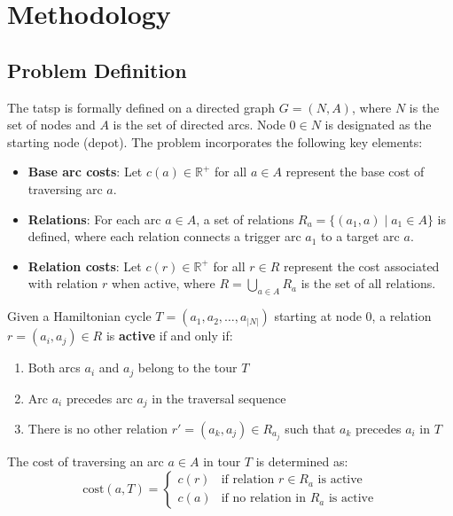\documentclass[twocolumn, switch]{article} %
\begin{document}
\section{Methodology}

\subsection{Problem Definition}

The \gls{tatsp} is formally defined on a directed graph $G = (N, A)$, where $N$ is the set of nodes and $A$ is the set of directed arcs. Node $0 \in N$ is designated as the starting node (depot). The problem incorporates the following key elements:

\begin{itemize}
\item \textbf{Base arc costs}: Let $c(a) \in \mathbb{R}^+$ for all $a \in A$ represent the base cost of traversing arc $a$.
\item \textbf{Relations}: For each arc $a \in A$, a set of relations $R_a = \{(a_1, a) \mid a_1 \in A\}$ is defined, where each relation connects a trigger arc $a_1$ to a target arc $a$.
\item \textbf{Relation costs}: Let $c(r) \in \mathbb{R}^+$ for all $r \in R$ represent the cost associated with relation $r$ when active, where $R = \bigcup_{a \in A} R_a$ is the set of all relations.
\end{itemize}

Given a Hamiltonian cycle $T = (a_1, a_2, \ldots, a_{|N|})$ starting at node $0$, a relation $r = (a_i, a_j) \in R$ is \textbf{active} if and only if:
\begin{enumerate}
\item Both arcs $a_i$ and $a_j$ belong to the tour $T$
\item Arc $a_i$ precedes arc $a_j$ in the traversal sequence
\item There is no other relation $r' = (a_k, a_j) \in R_{a_j}$ such that $a_k$ precedes $a_i$ in $T$
\end{enumerate}

The cost of traversing an arc $a \in A$ in tour $T$ is determined as:
\begin{equation}
\text{cost}(a, T) = \begin{cases}
c(r) & \text{if relation } r \in R_a \text{ is active} \\
c(a) & \text{if no relation in } R_a \text{ is active}
\end{cases}
\end{equation}
\end{document}
